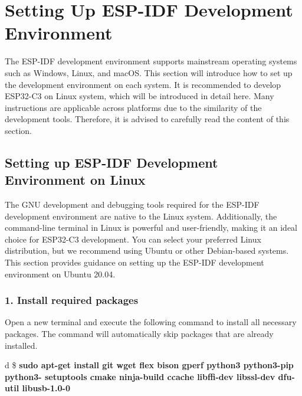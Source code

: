 \documentclass[a4paper,12pt]{book}
\begin{document}
\section{Setting Up ESP-IDF Development Environment}
The ESP-IDF development environment supports mainstream operating systems such as Windows, Linux, and macOS. This section will introduce how to set up the development environment on each system. It is recommended to develop ESP32-C3 on Linux system, which will be introduced in detail here. Many instructions are applicable across platforms due to the similarity of the development tools. Therefore, it is advised to carefully read the content of this section.


\subsection{Setting up ESP-IDF Development Environment on Linux}
The GNU development and debugging tools required for the ESP-IDF development environment are native to the Linux system. Additionally, the command-line terminal in Linux is powerful and user-friendly, making it an ideal choice for ESP32-C3 development. You can select your preferred Linux distribution, but we recommend using Ubuntu or other Debian-based systems. This section provides guidance on setting up the ESP-IDF development environment on Ubuntu 20.04.

\subsubsection{1. Install required packages}
Open a new terminal and execute the following command to install all necessary packages. The command will automatically skip packages that are already installed.

\begin{codebloc}
\begin{tabular}{d}
\$ \textbf{sudo apt-get install git wget flex bison gperf python3 python3-pip python3- setuptools cmake ninja-build ccache libffi-dev libssl-dev dfu-util libusb-1.0-0}
\end{tabular}
\end{codebloc}

\end{document}
